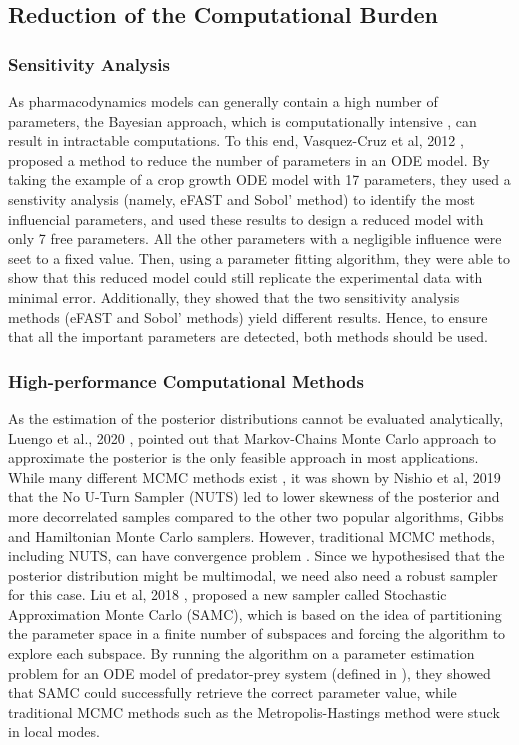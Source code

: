 \documentclass[11pt]{article}
\begin{document}
\subsection{Reduction of the Computational Burden}
\subsubsection{Sensitivity Analysis}
As pharmacodynamics models can generally contain a high number of parameters, the Bayesian approach, which is computationally intensive \cite{revParamEst}, can result in intractable computations. To this end, Vasquez-Cruz et al, 2012 \cite{tomgro}, proposed a method to reduce the number of parameters in an ODE model. By taking the example of a crop growth ODE model with 17 parameters, they used a senstivity analysis (namely, eFAST and Sobol' method) to identify the most influencial parameters, and used these results to design a reduced model with only 7 free parameters. All the other parameters with a negligible influence were seet to a fixed value. Then, using a parameter fitting algorithm, they were able to show that this reduced model could still replicate the experimental data with minimal error. Additionally, they showed that the two sensitivity analysis methods (eFAST and Sobol' methods) yield different results. Hence, to ensure that all the important parameters are detected, both methods should be used.

\subsubsection{High-performance Computational Methods}
As the estimation of the posterior distributions cannot be evaluated analytically, Luengo et al., 2020 \cite{MCMethods}, pointed out that Markov-Chains Monte Carlo approach to approximate the posterior is the only feasible approach in most applications. While many different MCMC methods exist \cite{ReviewMCMCAlgo}, it was shown by Nishio et al, 2019 \cite{NUTSvsHMCvsGibbs} that the No U-Turn Sampler (NUTS) led to lower skewness of the posterior and more decorrelated samples compared to the other two popular algorithms, Gibbs and Hamiltonian Monte Carlo samplers. However, traditional MCMC methods, including NUTS, can have convergence problem \cite{mcmcTrapped}. Since we hypothesised that the posterior distribution might be multimodal, we need also need a robust sampler for this case. Liu et al, 2018 \cite{liu_wang}, proposed a new sampler called Stochastic Approximation Monte Carlo (SAMC), which is based on the idea of partitioning the parameter space in a finite number of subspaces and forcing the algorithm to explore each subspace. By running the algorithm on a parameter estimation problem for an ODE model of predator-prey system (defined in \cite{fussmann}), they showed that SAMC could successfully retrieve the correct parameter value, while traditional MCMC methods such as the Metropolis-Hastings method were stuck in local modes.
\end{document}
